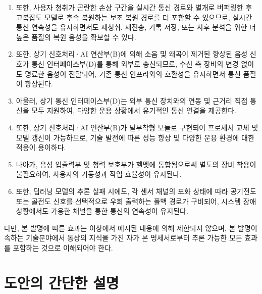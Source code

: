 \documentclass{article}
\begin{document}
\begin{enumerate}[label = \textbf{(\arabic*)}]
    \item 또한, 사용자 청취가 곤란한 손상 구간을 실시간 통신 경로와 별개로 버퍼링한 후 고복잡도 모델로 후속 복원하는 보조 복원 경로를 더 포함할 수 있으므로, 실시간 통신 연속성을 유지하면서도 재청취, 재전송, 기록 저장, 또는 사후 분석을 위한 더 높은 품질의 복원 음성을 확보할 수 있다.

    \item 또한, 상기 신호처리·AI 연산부(B)에 의해 소음 및 왜곡이 제거된 향상된 음성 신호가 통신 인터페이스부(D)를 통해 외부로 송신되므로, 수신 측 장비의 변경 없이도 명료한 음성이 전달되어, 기존 통신 인프라와의 호환성을 유지하면서 통신 품질이 향상된다.
    
    \item 아울러, 상기 통신 인터페이스부(D)는 외부 통신 장치와의 연동 및 근거리 직접 통신을 모두 지원하여, 다양한 운용 상황에서 유기적인 통신 연결을 제공한다.

    \item 또한, 상기 신호처리·AI 연산부(B)가 탈부착형 모듈로 구현되어 프로세서 교체 및 모델 갱신이 가능하므로, 기술 발전에 따른 성능 향상 및 다양한 운용 환경에 대한 적응이 용이하다. 
    
    \item 나아가, 음성 입출력부 및 청력 보호부가 헬멧에 통합됨으로써 별도의 장비 착용이 불필요하여, 사용자의 기동성과 작업 효율성이 유지된다.

    \item 또한, 딥러닝 모델의 추론 실패 시에도, 각 센서 채널의 포화 상태에 따라 공기전도 또는 골전도 신호를 선택적으로 우회 출력하는 폴백 경로가 구비되어, 시스템 장애 상황에서도 가용한 채널을 통한 통신의 연속성이 유지된다.

\end{enumerate}

다만, 본 발명에 따른 효과는 이상에서 예시된 내용에 의해 제한되지 않으며, 본 발명이 속하는 기술분야에서 통상의 지식을 가진 자가 본 명세서로부터 추론 가능한 모든 효과를 포함하는 것으로 이해되어야 한다.





\section{도안의 간단한 설명}
\end{document}
